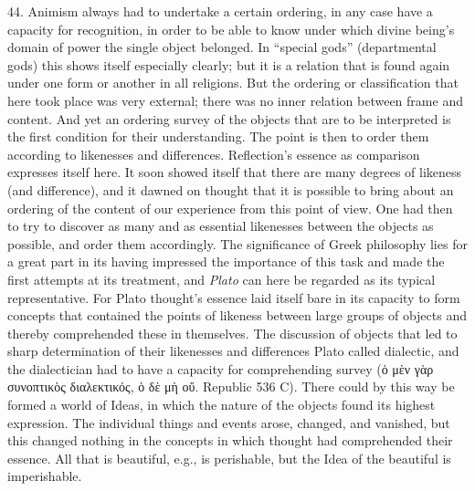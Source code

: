 \documentclass[12pt,a4paper]{book}
\newcommand{\opage}[1]{\marginnote{\footnotesize\textit{[#1]}}}
\begin{document}
44. Animism always had to undertake a certain ordering, in any case have a
capacity for recognition, in order to be able to know under which divine
being's domain of power the single object belonged. In ``special gods''
(departmental gods) this shows itself especially clearly; but it is a
relation that is found again under one form or another in all religions.
But the ordering or classification that here took place was very external;
there was no inner relation between frame and content. And yet an ordering
survey of the objects that are to be interpreted is the first condition for
their understanding. The point is then to order them according to
likenesses and differences. Reflection's essence as comparison expresses
itself here. It soon showed itself that there are many degrees of likeness
(and difference), and it dawned on thought that it is possible to bring
about an ordering of the content of our experience from this point of view.
One had then to try to discover as many and as essential likenesses between
the objects as possible, and order them accordingly. The significance of
Greek philosophy lies for a great part in its having impressed the
importance of this task and made the first attempts at its treatment, and
\emph{Plato} can here be regarded as its typical representative. For Plato
thought's essence laid itself bare in its capacity to form concepts that
contained the points of likeness between large groups of objects and
thereby comprehended these in themselves. The discussion of objects that
led to sharp determination of their likenesses and differences Plato called
dialectic, and the dialectician had to have a capacity for \opage{119}comprehending
survey (ὁ μὲν γὰρ συνοπτικὸς διαλεκτικός, ὁ δὲ μὴ οὔ. Republic 536 C).
There could by this way be formed a world of Ideas, in which the nature of
the objects found its highest expression. The individual things and events
arose, changed, and vanished, but this changed nothing in the concepts in
which thought had comprehended their essence. All that is beautiful, e.g.,
is perishable, but the Idea of the beautiful is imperishable.
\end{document}
